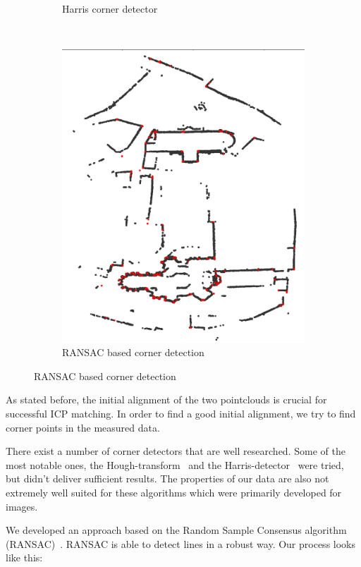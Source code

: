 \documentclass[10pt,twocolumn,letterpaper]{article}
\begin{document}
\begin{figure}
\begin{subfigure}{.5\linewidth}
  \caption{Harris corner detector}
  \label{fig:harris}
\end{subfigure}
\\
\begin{subfigure}{1\linewidth}
  \centering
  \includegraphics[width=.8\linewidth]{images/ransac_corner.png}
  \caption{RANSAC based corner detection}
  \label{fig:ransac_corner}
\end{subfigure}

\end{figure}

As stated before, the initial alignment of the two pointclouds is crucial for successful ICP matching. 
In order to find a good initial alignment, we try to find corner points in the measured data. 

There exist a number of corner detectors that are well researched. Some of the most notable ones, the Hough-transform~\cite{illingworth1988survey} and the Harris-detector~\cite{harris1988combined} were tried, but didn't deliver sufficient results. The properties of our data are also not extremely well suited for these algorithms which were primarily developed for images. 

We developed an approach based on the Random Sample Consensus algorithm (RANSAC)~\cite{fischler1981random}. RANSAC is able to detect lines in a robust way. Our process looks like this:
\end{document}
